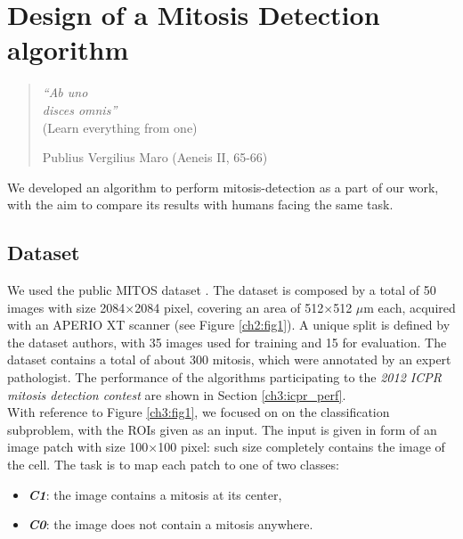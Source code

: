 \chapter{Design of a Mitosis Detection algorithm}
\label{chapter4}
\thispagestyle{empty}

\begin{quotation}
{\footnotesize
\noindent \emph{\textquotedblleft Ab uno\\ disces omnis\textquotedblright}\\
\noindent (Learn everything from one)
\begin{flushright}
Publius Vergilius Maro (Aeneis II, 65-66)
\end{flushright}
}
\end{quotation}

\vspace{2cm}


We developed an algorithm to perform mitosis-detection as a part of our work, with the aim to compare its results with humans facing the same task.

\section{Dataset}
\label{ch4:ds}

We used the public MITOS dataset \cite{icpr}. The dataset is composed by a total of 50 images with size 2084$\times$2084 pixel,
covering an area of 512$\times$512 $\mu$m each, acquired with an APERIO XT scanner (see Figure \ref{ch2:fig1}). 
A unique split is defined by the dataset authors, with 35 images used for training and 15 for evaluation.
The dataset contains a total of about 300 mitosis, which were annotated by an expert pathologist.
The performance of the algorithms participating to the \textit{2012 ICPR mitosis detection contest} are shown in Section \ref{ch3:icpr_perf}.\\
With reference to Figure \ref{ch3:fig1}, we focused on on the classification subproblem, with the \Glspl{ROI} given as an input.
The input is given in form of an image patch with size 100$\times$100 pixel: such size completely contains the image of the cell.
\clearpage
\noindent The task is to map each patch to one of two classes:
\begin{itemize}
 \item [] \textit{\textbf{C1}}: the image contains a mitosis at its center,
 \item [] \textit{\textbf{C0}}: the image does not contain a mitosis anywhere. 
\end{itemize}

